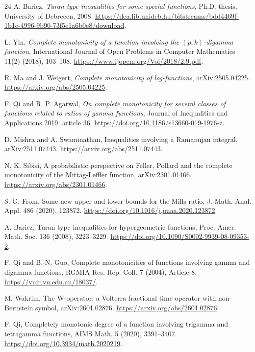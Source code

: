 \documentclass[11pt]{article}
\numberwithin{equation}{section}
\theoremstyle{definition}
\theoremstyle{remark}
\newcommand{\1}{\mathbf 1}
\begin{document}
\begin{thebibliography}{24}
A. Baricz,
\emph{Turan type inequalities for some special functions},
Ph.D. thesis, University of Debrecen, 2008.
\url{https://dea.lib.unideb.hu/bitstreams/bdd4469f-1b1e-4996-9b90-73f5e1a6b0e8/download}.

L. Yin,
\emph{Complete monotonicity of a function involving the \((p,k)\)-digamma function},
International Journal of Open Problems in Computer Mathematics 11(2) (2018), 103--108.
\url{https://www.ijopcm.org/Vol/2018/2.9.pdf}.

R. Ma and J. Weigert,
\emph{Complete monotonicity of log-functions},
arXiv:2505.04225.
\url{https://arxiv.org/abs/2505.04225}.

F. Qi and R. P. Agarwal,
\emph{On complete monotonicity for several classes of functions related to
ratios of gamma functions},
Journal of Inequalities and Applications 2019, article 36.
\url{https://doi.org/10.1186/s13660-019-1976-z}.


D. Mishra and A. Swaminathan,
\newblock Inequalities involving a Ramanujan integral,
\newblock arXiv:2511.07443.
\url{https://arxiv.org/abs/2511.07443}.

N. K. Sibisi,
\newblock A probabilistic perspective on Feller, Pollard and the complete
  monotonicity of the Mittag-Leffler function,
\newblock arXiv:2301.01466.
\url{https://arxiv.org/abs/2301.01466}.

S. G. From,
\newblock Some new upper and lower bounds for the Mills ratio,
\newblock J. Math. Anal. Appl. 486 (2020), 123872.
\url{https://doi.org/10.1016/j.jmaa.2020.123872}.

A. Baricz,
\newblock Turan type inequalities for hypergeometric functions,
\newblock Proc. Amer. Math. Soc. 136 (2008), 3223--3229.
\url{https://doi.org/10.1090/S0002-9939-08-09353-2}.

F. Qi and B.-N. Guo,
\newblock Complete monotonicities of functions involving gamma and digamma
  functions,
\newblock RGMIA Res. Rep. Coll. 7 (2004), Article 8.
\url{https://vuir.vu.edu.au/18037/}.

M. Wakrim,
\newblock The W-operator: a Volterra fractional time operator with
  non-Bernstein symbol,
\newblock arXiv:2601.02876.
\url{https://arxiv.org/abs/2601.02876}.

F. Qi,
\newblock Completely monotonic degree of a function involving trigamma and
  tetragamma functions,
\newblock AIMS Math. 5 (2020), 3391--3407.
\url{https://doi.org/10.3934/math.2020219}.


\end{thebibliography}
\end{document}
